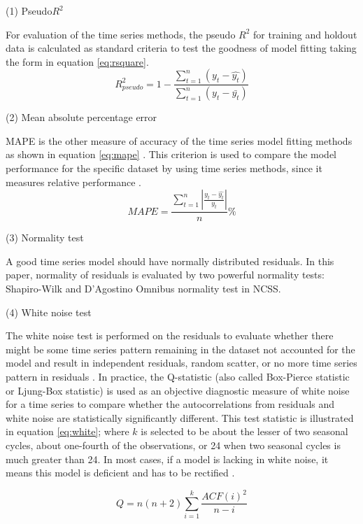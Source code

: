 (1) Pseudo$R^2$

For evaluation of the time series methods, the pseudo $R^2$ for training and holdout data is calculated as standard criteria to test the goodness of model fitting taking the form in equation \ref{eq:rsquare}.
\begin{equation}
	\label{eq:rsquare}
	R_{pseudo}^2=1-\frac{\sum_{t=1}^{n}(y_t-\hat{y_t})}{\sum_{t=1}^{n}(y_t-\bar{y_t})}
\end{equation}

(2) Mean absolute percentage error

MAPE is the other measure of accuracy of the time series model fitting methods as shown in equation \ref{eq:mape} \citep{Hanke1998, Bowerman2005}. This criterion is used to compare the model performance for the specific dataset by using time series methods, since it measures relative performance \citep{Chu1998}.
\begin{equation}
	\label{eq:mape}
	MAPE=\frac{\sum_{t=1}^{n}\left | \frac{y_t-\hat{y_t}}{y_t} \right |}{n}\%
\end{equation}

(3) Normality test

A good time series model should have normally distributed residuals. In this paper, normality of residuals is evaluated by two powerful normality tests: Shapiro-Wilk \citep{Shapiro1965} and D'Agostino Omnibus normality test \citep{d1990} in NCSS.

(4) White noise test

The white noise test is performed on the residuals to evaluate whether there might be some time series pattern remaining in the dataset not accounted for the model and result in independent residuals, random scatter, or no more time series pattern in residuals \citep{Weisent2010}. In practice, the Q-statistic (also called Box-Pierce statistic or Ljung-Box statistic) is used as an objective diagnostic measure of white noise for a time series to compare whether the autocorrelations from residuals and white noise are statistically significantly different. This test statistic is illustrated in equation \ref{eq:white}; where $k$ is selected to be about the lesser of two seasonal cycles, about one-fourth of the observations, or 24 when two seasonal cycles is much greater than 24. In most cases, if a model is lacking in white noise, it means this model is deficient and has to be rectified \citep{de1998}. 

\begin{equation}
	\label{eq:white}
	Q=n(n+2)\sum_{i=1}^k{\frac{ACF(i)^2}{n-i}}
\end{equation}
